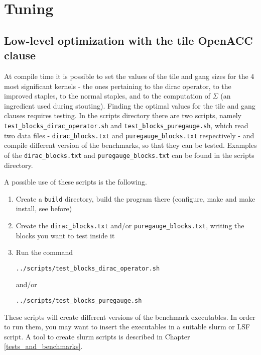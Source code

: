 \section{Tuning}
\label{tuning}

\subsection{Low-level optimization with the \textsf{ tile} OpenACC clause}

At compile time it is possible to set the values of the \textsf{ tile } and \textsf{ gang} sizes 
for the 4 most significant kernels - the ones pertaining to the 
dirac operator, to the improved staples, to the normal staples, and to the computation of
$\Sigma$ (an ingredient used during stouting).
Finding the optimal values for the \textsf{ tile} and \textsf{ gang} clauses requires testing. 
In the \textsf{ scripts} directory there are two scripts, namely 
\verb|test_blocks_dirac_operator.sh| and 
\verb|test_blocks_puregauge.sh|, which read two data files - 
\verb|dirac_blocks.txt| and 
\verb|puregauge_blocks.txt| respectively - and compile different version of the benchmarks, 
so that they can be tested. Examples of the \verb|dirac_blocks.txt| and 
\verb|puregauge_blocks.txt| can be found in the \textsf{ scripts} directory. 

A possible use of these scripts is the following.
\begin{enumerate}
 \item Create a \verb|build| directory, build the program there (configure, make and 
 make install, see before)
 \item Create the \verb|dirac_blocks.txt| and/or \verb|puregauge_blocks.txt|, writing 
 the blocks you want to test inside it
 \item Run the command
 \begin{verbatim}
../scripts/test_blocks_dirac_operator.sh
 \end{verbatim}
 and/or
 \begin{verbatim}
../scripts/test_blocks_puregauge.sh  
 \end{verbatim}
\end{enumerate}
 These scripts will create different versions of the benchmark executables. In order to run 
 them, you may want to insert the executables in a suitable slurm or LSF script.
 A tool to create slurm scripts is described in Chapter \ref{tests_and_benchmarks}.
 
